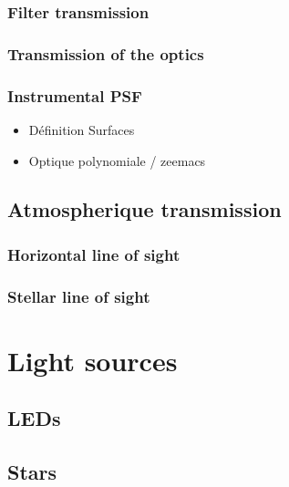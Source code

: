 \documentclass[\docopts]{\docclass}
\begin{document}
\subsubsection{Filter transmission}
\label{sec:filters}

\subsubsection{Transmission of the optics}
\label{sec:optics}

\subsubsection{Instrumental PSF}
\label{sec:PSF}
\begin{itemize}
\item Définition Surfaces
\item Optique polynomiale / zeemacs
\end{itemize}



\subsection{Atmospherique transmission}
\label{sec:atmosphere}

\subsubsection{Horizontal line of sight}
\label{sec:hline}


\subsubsection{Stellar line of sight}
\label{sec:av}


\section{Light sources}
\label{sec:sources}

\subsection{LEDs}
\label{sec:leds}


\subsection{Stars}
\label{sec:stars}
\end{document}
